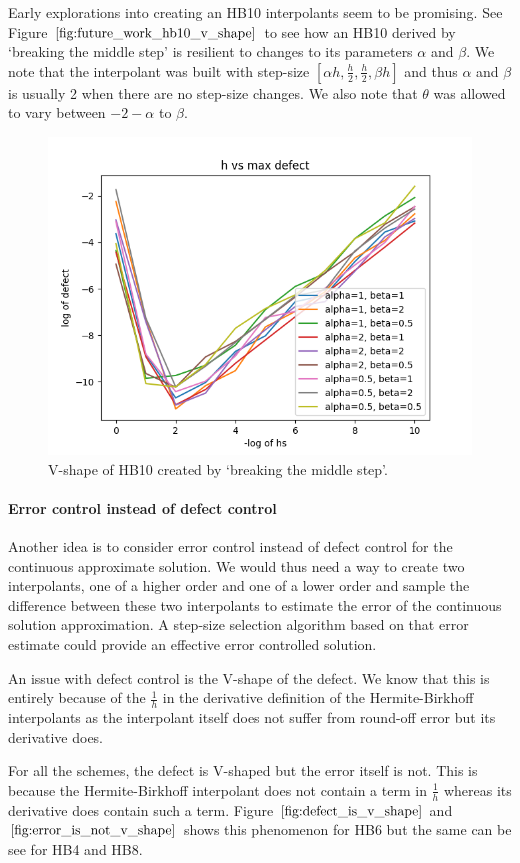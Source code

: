 \documentclass{report}
\begin{document}
Early explorations into creating an HB10 interpolants seem to be promising. See Figure $\ref{fig:future_work_hb10_v_shape}$ to see how an HB10 derived by `breaking the middle step' is resilient to changes to its parameters $\alpha$ and $\beta$. We note that the interpolant was built with step-size $[\alpha h, \frac{h}{2}, \frac{h}{2}, \beta h]$ and thus $\alpha$ and $\beta$ is usually 2 when there are no step-size changes. We also note that $\theta$ was allowed to vary between $-2-\alpha$ to $\beta$.

\begin{figure}[H]
\centering
\includegraphics[width=0.7\linewidth]{./figures/future_work_hb10_v_shape}
\caption{V-shape of HB10 created by `breaking the middle step'.}
\label{fig:future_work_hb10_v_shape}
\end{figure}


\paragraph{Error control instead of defect control}
Another idea is to consider error control instead of defect control for the continuous approximate solution. We would thus need a way to create two interpolants, one of a higher order and one of a lower order and sample the difference between these two interpolants to estimate the error of the continuous solution approximation. A step-size selection algorithm based on that error estimate could provide an effective error controlled solution.

An issue with defect control is the V-shape of the defect. We know that this is entirely because of the $\frac{1}{h}$ in the derivative definition of the Hermite-Birkhoff interpolants as the interpolant itself does not suffer from round-off error but its derivative does.

For all the schemes, the defect is V-shaped but the error itself is not. This is because the Hermite-Birkhoff interpolant does not contain a term in $\frac{1}{h}$ whereas its derivative does contain such a term. Figure $\ref{fig:defect_is_v_shape}$ and $\ref{fig:error_is_not_v_shape}$ shows this phenomenon for HB6 but the same can be see for HB4 and HB8. 
\end{document}
